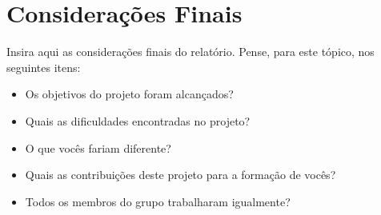 \section{Considerações Finais}

Insira aqui as considerações finais do relatório. Pense, para este tópico, nos seguintes itens:

\begin{itemize}
    \item Os objetivos do projeto foram alcançados?
    \item Quais as dificuldades encontradas no projeto?
    \item O que vocês fariam diferente?
    \item Quais as contribuições deste projeto para a formação de vocês?
    \item Todos os membros do grupo trabalharam igualmente?
\end{itemize}